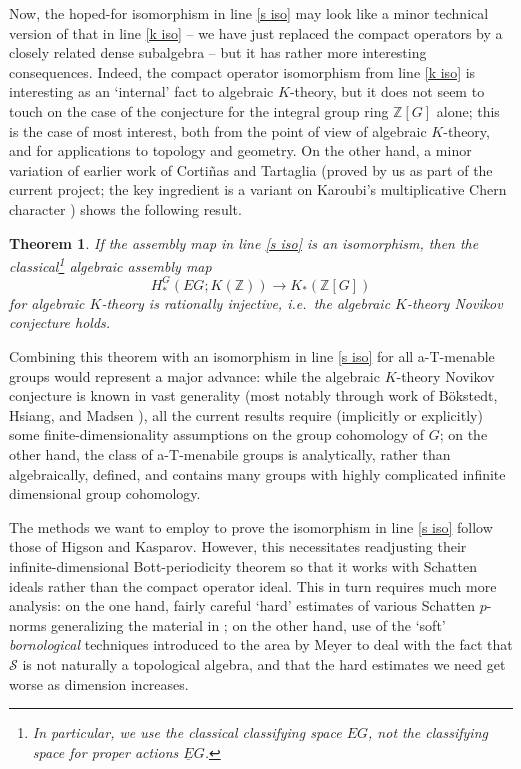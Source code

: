 \documentclass[11pt]{article}
\newcommand{\Z}{\mathbb{Z}}
\theoremstyle{plain}
\newtheorem{theorem}{Theorem}[section]
\theoremstyle{definition}
\theoremstyle{remark}
\begin{document}
Now, the hoped-for isomorphism in line \eqref{s iso} may look like a minor technical version of that in line \eqref{k iso} -- we have just replaced the compact operators by a closely related dense subalgebra -- but it has rather more interesting consequences.  Indeed, the compact operator isomorphism from line \eqref{k iso} is interesting as an `internal' fact to algebraic $K$-theory, but it does not seem to touch on the case of the conjecture for the integral group ring $\Z[G]$ alone; this is the case of most interest, both from the point of view of algebraic $K$-theory, and for applications to topology and geometry.  On the other hand, a minor variation of earlier work of Corti\~{n}as and Tartaglia \cite{Cortinas:2013ly} (proved by us as part of the current project; the key ingredient is a variant on Karoubi's multiplicative Chern character \cite[Chapter 7]{Karoubi:1987zr}) shows the following result.

\begin{theorem}\label{reg the}
If the assembly map in line \eqref{s iso} is an isomorphism, then the classical\footnote{In particular, we use the classical classifying space $EG$, not the classifying space for proper actions $\underline{E}G$.} algebraic assembly map
$$
H^G_*(EG;K(\mathcal{\Z})) \to K_*(\Z[G])
$$
for algebraic $K$-theory is rationally injective, i.e.\ the \emph{algebraic $K$-theory Novikov conjecture} holds.
\end{theorem}

Combining this theorem with an isomorphism in line \eqref{s iso} for all a-T-menable groups would represent a major advance: while the algebraic $K$-theory Novikov conjecture is known in vast generality (most notably through work of B\"{o}kstedt, Hsiang, and Madsen \cite{Bokstedt:1993il}), all the current results require (implicitly or explicitly) some finite-dimensionality assumptions on the group cohomology of $G$; on the other hand, the class of a-T-menabile groups is analytically, rather than algebraically, defined, and contains many groups with highly complicated infinite dimensional group cohomology. 

The methods we want to employ to prove the isomorphism in line \eqref{s iso} follow those of Higson and Kasparov.  However, this necessitates readjusting their infinite-dimensional Bott-periodicity theorem \cite{Higson:1999be} so that it works with Schatten ideals rather than the compact operator ideal.  This in turn requires much more analysis: on the one hand, fairly careful `hard' estimates of various Schatten $p$-norms generalizing the material in \cite[Chapter 4]{Simon:2005aa}; on the other hand, use of the `soft' \emph{bornological} techniques introduced to the area by Meyer \cite{Meyer:2007aa} to deal with the fact that $\mathcal{S}$ is not naturally a topological algebra, and that the hard estimates we need get worse as dimension increases.
\end{document}
